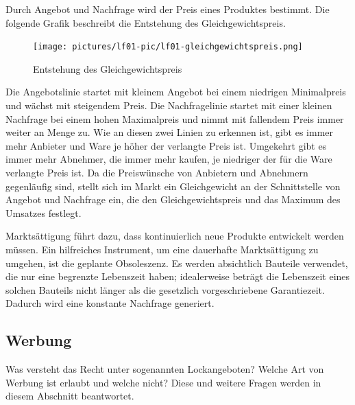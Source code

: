Durch Angebot und Nachfrage wird der Preis eines Produktes bestimmt. Die folgende Grafik beschreibt die Entstehung des Gleichgewichtspreis.

\begin{figure}
	\begin{center}
		\texttt{[image: pictures/lf01-pic/lf01-gleichgewichtspreis.png]}
	\end{center}
	\caption{Entstehung des Gleichgewichtspreis}
\end{figure}

Die Angebotslinie startet mit kleinem Angebot bei einem niedrigen Minimalpreis und wächst mit steigendem Preis. Die Nachfragelinie startet mit einer kleinen Nachfrage bei einem hohen Maximalpreis und nimmt mit fallendem Preis immer weiter an Menge zu. Wie an diesen zwei Linien zu erkennen ist, gibt es immer mehr Anbieter und Ware je höher der verlangte Preis ist. Umgekehrt gibt es immer mehr Abnehmer, die immer mehr kaufen, je niedriger der für die Ware verlangte Preis ist. Da die Preiswünsche von Anbietern und Abnehmern gegenläufig sind, stellt sich im Markt ein Gleichgewicht an der Schnittstelle von Angebot und Nachfrage ein, die den Gleichgewichtspreis und das Maximum des Umsatzes festlegt.

Marktsättigung führt dazu, dass kontinuierlich neue Produkte entwickelt werden müssen. Ein hilfreiches Instrument, um eine dauerhafte Marktsättigung zu umgehen, ist die geplante Obsoleszenz. Es werden absichtlich Bauteile verwendet, die nur eine begrenzte Lebenszeit haben; idealerweise beträgt die Lebenszeit eines solchen Bauteils nicht länger als die gesetzlich vorgeschriebene Garantiezeit. Dadurch wird eine konstante Nachfrage generiert.


\subsection{Werbung}

Was versteht das Recht unter sogenannten \ql Lockangeboten\qr? Welche Art von Werbung ist erlaubt und welche nicht? Diese und weitere Fragen werden in diesem Abschnitt beantwortet. 


